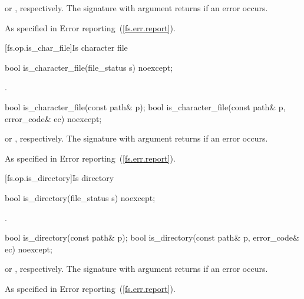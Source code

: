 \begin{itemdescr}
\pnum
\returns {} or , respectively.
The signature with argument  returns  if an error occurs.

\pnum
\throws As specified in Error reporting~(\ref{fs.err.report}).
\end{itemdescr}


[fs.op.is_char_file]{Is character file}

\begin{itemdecl}
bool is_character_file(file_status s) noexcept;
\end{itemdecl}

\begin{itemdescr}
\pnum
\returns {}.
\end{itemdescr}

\begin{itemdecl}
bool is_character_file(const path& p);
bool is_character_file(const path& p, error_code& ec) noexcept;
\end{itemdecl}

\begin{itemdescr}
\pnum
\returns {}
  or ,
  respectively. The signature with argument  returns 
  if an error occurs.

\pnum
\throws As specified in Error reporting~(\ref{fs.err.report}).
\end{itemdescr}


[fs.op.is_directory]{Is directory}

\begin{itemdecl}
bool is_directory(file_status s) noexcept;
\end{itemdecl}

\begin{itemdescr}
\pnum
\returns {}.
\end{itemdescr}

\begin{itemdecl}
bool is_directory(const path& p);
bool is_directory(const path& p, error_code& ec) noexcept;
\end{itemdecl}

\begin{itemdescr}
\pnum
\returns {} or ,
  respectively. The signature with argument
   returns  if an error occurs.

\pnum
\throws As specified in Error reporting~(\ref{fs.err.report}).
\end{itemdescr}



